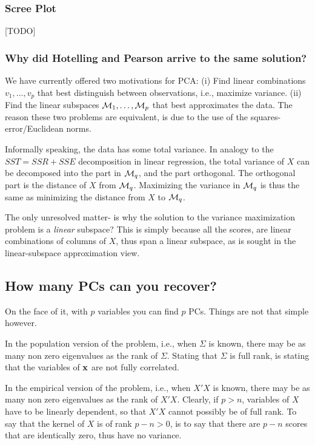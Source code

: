 \documentclass[12pt,a4paper]{article}
\begin{document}
\subsubsection{Scree Plot}
\label{sec:scree_plot}
[TODO]




\subsubsection{Why did Hotelling and Pearson arrive to the same solution?}
\label{sec:pca_intuition}

We have currently offered two motivations for PCA: 
(i) Find linear combinations $v_1,\dots,v_p$ that best distinguish between observations, i.e., maximize variance. 
(ii) Find the linear subspaces $\mathcal{M}_1,\dots,\mathcal{M}_p$ that best approximates the data.
The reason these two problems are equivalent, is due to the use of the squares-error/Euclidean norms.

Informally speaking, the data has some total variance. 
In analogy to the $SST=SSR+SSE$ decomposition in linear regression, the total variance of $X$ can be decomposed into the part in $\mathcal{M}_q$, and the part orthogonal. 
The orthogonal part is the distance of $X$ from $\mathcal{M}_q$. 
Maximizing the variance in $\mathcal{M}_q$ is thus the same as minimizing the distance from $X$ to $\mathcal{M}_q$. 

The only unresolved matter- is why the solution to the variance maximization problem is a \emph{linear} subspace?
This is simply because all the scores, are linear combinations of columns of $X$, thus span a linear subspace, as is sought in the linear-subspace approximation view. 




\subsection{How many PCs can you recover?}
\label{sec:how-many-pcs}
On the face of it, with $p$ variables you can find $p$ PCs. 
Things are not that simple however.

In the population version of the problem, i.e., when $\Sigma$ is known, there may be as many non zero eigenvalues as the rank of $\Sigma$. 
Stating that $\Sigma$ is full rank, is stating that the variables of $\mathbf{x}$ are not fully correlated.

In the empirical version of the problem, i.e., when $X'X$ is known, there may be as many non zero eigenvalues as the rank of $X'X$.
Clearly, if $p>n$, variables of $X$ have to be linearly dependent, so that $X'X$ cannot possibly be of full rank.
To say that the kernel of $X$ is of rank $p-n>0$, is to say that there are $p-n$ scores that are identically zero, thus have no variance. 
\end{document}
